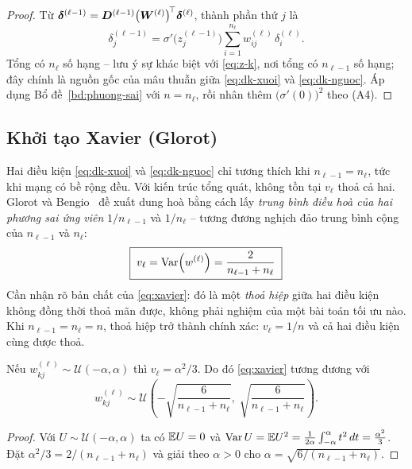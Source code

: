 \begin{proof}
Từ $\bm{\delta}^{(\ell-1)} = \bm{D}^{(\ell-1)}\big(\bm{W}^{(\ell)}\big)^{\!\top}
\bm{\delta}^{(\ell)}$, thành phần thứ $j$ là
\[
\delta^{(\ell-1)}_j = \sigma'\!\big(z^{(\ell-1)}_j\big)
\sum_{i=1}^{n_\ell} w^{(\ell)}_{ij}\,\delta^{(\ell)}_i .
\]
Tổng có $n_\ell$ số hạng -- lưu ý sự khác biệt với \eqref{eq:z-k}, nơi tổng có
$n_{\ell-1}$ số hạng; đây chính là nguồn gốc của mâu thuẫn giữa
\eqref{eq:dk-xuoi} và \eqref{eq:dk-nguoc}. Áp dụng Bổ đề~\ref{bd:phuong-sai} với
$n = n_\ell$, rồi nhân thêm $\big(\sigma'(0)\big)^2$ theo (A4).
\end{proof}
 
\subsection{Khởi tạo Xavier (Glorot)}
\label{subsec:xavier}
 
Hai điều kiện \eqref{eq:dk-xuoi} và \eqref{eq:dk-nguoc} chỉ tương thích khi
$n_{\ell-1} = n_{\ell}$, tức khi mạng có bề rộng đều. Với kiến trúc tổng quát,
không tồn tại $v_\ell$ thoả cả hai. Glorot và Bengio~\cite{glorot2010} đề xuất
dung hoà bằng cách lấy \emph{trung bình điều hoà của hai phương sai ứng viên}
$1/n_{\ell-1}$ và $1/n_{\ell}$ -- tương đương nghịch đảo trung bình cộng của
$n_{\ell-1}$ và $n_{\ell}$:
\begin{equation}
\boxed{\;
v_\ell = \operatorname{Var}\!\left(w^{(\ell)}\right) = \frac{2}{n_{\ell-1} + n_{\ell}} \; }
\label{eq:xavier}
\end{equation}
Cần nhận rõ bản chất của \eqref{eq:xavier}: đó là một \emph{thoả hiệp} giữa hai
điều kiện không đồng thời thoả mãn được, không phải nghiệm của một bài toán tối
ưu nào. Khi $n_{\ell-1} = n_\ell = n$, thoả hiệp trở thành chính xác:
$v_\ell = 1/n$ và cả hai điều kiện cùng được thoả.
 
\begin{menhde}
\label{md:xavier-deu}
Nếu $w^{(\ell)}_{kj} \sim \mathcal{U}(-\alpha,\alpha)$ thì
$v_\ell = \alpha^2/3$. Do đó \eqref{eq:xavier} tương đương với
\begin{equation}
w^{(\ell)}_{kj} \sim
\mathcal{U}\!\left( -\sqrt{\frac{6}{n_{\ell-1}+n_{\ell}}},\;
                     \sqrt{\frac{6}{n_{\ell-1}+n_{\ell}}} \right).
\label{eq:xavier-uniform}
\end{equation}
\end{menhde}
 
\begin{proof}
Với $U \sim \mathcal{U}(-\alpha,\alpha)$ ta có $\mathbb{E} U = 0$ và
$\operatorname{Var} U = \mathbb{E} U^2 = \frac{1}{2\alpha}\int_{-\alpha}^{\alpha} t^2\,dt
= \frac{\alpha^2}{3}$. Đặt $\alpha^2/3 = 2/(n_{\ell-1}+n_\ell)$ và giải theo
$\alpha > 0$ cho $\alpha = \sqrt{6/(n_{\ell-1}+n_\ell)}$.
\end{proof}

